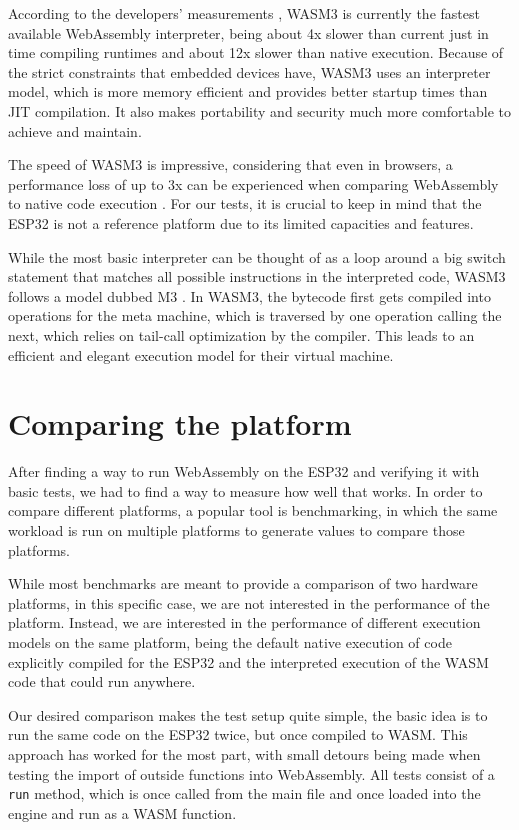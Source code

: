 According to the developers' measurements \autocite{shymanskyy_wasm3_2020}, WASM3 is currently the fastest available WebAssembly interpreter, being about 4x slower than current just in time compiling runtimes and about 12x slower than native execution. Because of the strict constraints that embedded devices have, WASM3 uses an interpreter model, which is more memory efficient and provides better startup times than JIT compilation. It also makes portability and security much more comfortable to achieve and maintain.

The speed of WASM3 is impressive, considering that even in browsers, a performance loss of up to 3x can be experienced when comparing WebAssembly to native code execution \autocite{jangda_not_2019}. For our tests, it is crucial to keep in mind that the ESP32 is not a reference platform due to its limited capacities and features.

While the most basic interpreter can be thought of as a loop around a big switch statement that matches all possible instructions in the interpreted code, WASM3 follows a model dubbed M3 \autocite{shymanskyy_wasm3interpreter_2020}. In WASM3, the bytecode first gets compiled into operations for the meta machine, which is traversed by one operation calling the next, which relies on tail-call optimization by the compiler. This leads to an efficient and elegant execution model for their virtual machine.

\section{Comparing the platform}
After finding a way to run WebAssembly on the ESP32 and verifying it with basic tests, we had to find a way to measure how well that works. In order to compare different platforms, a popular tool is benchmarking, in which the same workload is run on multiple platforms to generate values to compare those platforms.

While most benchmarks are meant to provide a comparison of two hardware platforms, in this specific case, we are not interested in the performance of the platform. Instead, we are interested in the performance of different execution models on the same platform, being the default native execution of code explicitly compiled for the ESP32 and the interpreted execution of the WASM code that could run anywhere.

Our desired comparison makes the test setup quite simple, the basic idea is to run the same code on the ESP32 twice, but once compiled to WASM. This approach has worked for the most part, with small detours being made when testing the import of outside functions into WebAssembly. All tests consist of a \lstinline{run} method, which is once called from the main file and once loaded into the engine and run as a WASM function.


